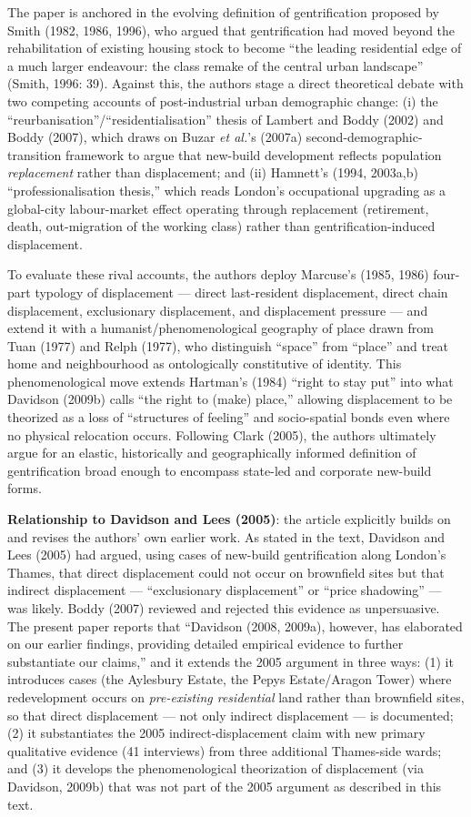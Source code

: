 The paper is anchored in the evolving definition of gentrification proposed by Smith (1982, 1986, 1996), who argued that gentrification had moved beyond the rehabilitation of existing housing stock to become ``the leading residential edge of a much larger endeavour: the class remake of the central urban landscape'' (Smith, 1996: 39). Against this, the authors stage a direct theoretical debate with two competing accounts of post-industrial urban demographic change: (i) the ``reurbanisation''/``residentialisation'' thesis of Lambert and Boddy (2002) and Boddy (2007), which draws on Buzar \textit{et al.}'s (2007a) second-demographic-transition framework to argue that new-build development reflects population \emph{replacement} rather than displacement; and (ii) Hamnett's (1994, 2003a,b) ``professionalisation thesis,'' which reads London's occupational upgrading as a global-city labour-market effect operating through replacement (retirement, death, out-migration of the working class) rather than gentrification-induced displacement.

To evaluate these rival accounts, the authors deploy Marcuse's (1985, 1986) four-part typology of displacement --- direct last-resident displacement, direct chain displacement, exclusionary displacement, and displacement pressure --- and extend it with a humanist/phenomenological geography of place drawn from Tuan (1977) and Relph (1977), who distinguish ``space'' from ``place'' and treat home and neighbourhood as ontologically constitutive of identity. This phenomenological move extends Hartman's (1984) ``right to stay put'' into what Davidson (2009b) calls ``the right to (make) place,'' allowing displacement to be theorized as a loss of ``structures of feeling'' and socio-spatial bonds even where no physical relocation occurs. Following Clark (2005), the authors ultimately argue for an elastic, historically and geographically informed definition of gentrification broad enough to encompass state-led and corporate new-build forms.

\textbf{Relationship to Davidson and Lees (2005)}: the article explicitly builds on and revises the authors' own earlier work. As stated in the text, Davidson and Lees (2005) had argued, using cases of new-build gentrification along London's Thames, that direct displacement could not occur on brownfield sites but that indirect displacement --- ``exclusionary displacement'' or ``price shadowing'' --- was likely. Boddy (2007) reviewed and rejected this evidence as unpersuasive. The present paper reports that ``Davidson (2008, 2009a), however, has elaborated on our earlier findings, providing detailed empirical evidence to further substantiate our claims,'' and it extends the 2005 argument in three ways: (1) it introduces cases (the Aylesbury Estate, the Pepys Estate/Aragon Tower) where redevelopment occurs on \emph{pre-existing residential} land rather than brownfield sites, so that direct displacement --- not only indirect displacement --- is documented; (2) it substantiates the 2005 indirect-displacement claim with new primary qualitative evidence (41 interviews) from three additional Thames-side wards; and (3) it develops the phenomenological theorization of displacement (via Davidson, 2009b) that was not part of the 2005 argument as described in this text.

